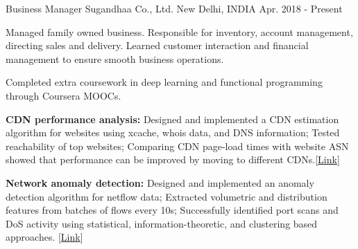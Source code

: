 
\begin{cventries}

  \cventry
    {Business Manager} %
    {Sugandhaa Co., Ltd.} %
    {New Delhi, INDIA} %
    {Apr. 2018 - Present} %
    {
      \begin{cvitems} %
      \item {Managed family owned business. Responsible for inventory, account management, directing sales and delivery. Learned customer interaction and financial management to ensure smooth business operations.}
    \item {Completed extra coursework in deep learning and functional programming through Coursera MOOCs.}
    \item {\textbf{CDN performance analysis:} Designed and implemented a CDN estimation algorithm for websites using xcache, whois data, and DNS information; Tested reachability of top websites; Comparing CDN page-load times with website ASN showed that performance can be improved by moving to different CDNs.\hfill [\href{https://github.com/shahifaqeer/cdn-analysis}{Link}]}
    \item {\textbf{Network anomaly detection:} Designed and implemented an anomaly detection algorithm for netflow data; Extracted volumetric and distribution features from batches of flows every 10s; Successfully identified port scans and DoS activity using statistical, information-theoretic, and clustering based approaches. \hfill [\href{https://github.com/shahifaqeer/netflow-anomaly-detector}{Link}]}
      \end{cvitems}
    }


\end{cventries}
